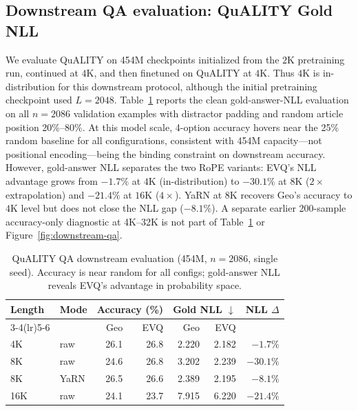 \subsection{Downstream QA evaluation: QuALITY Gold NLL}

We evaluate QuALITY \citep{pang2022quality} on 454M checkpoints initialized from the $2$K pretraining run, continued at $4$K, and then finetuned on QuALITY at $4$K. Thus $4$K is in-distribution for this downstream protocol, although the initial pretraining checkpoint used $L{=}2048$. Table~\ref{tab:quality-nll} reports the clean gold-answer-NLL evaluation on all $n{=}2086$ validation examples with distractor padding and random article position 20\%--80\%. At this model scale, 4-option accuracy hovers near the 25\% random baseline for all configurations, consistent with 454M capacity---not positional encoding---being the binding constraint on downstream accuracy. However, gold-answer NLL separates the two RoPE variants: EVQ's NLL advantage grows from \(-1.7\%\) at \(4\mathrm{K}\) (in-distribution) to \(-30.1\%\) at \(8\mathrm{K}\) (\(2\times\) extrapolation) and \(-21.4\%\) at \(16\mathrm{K}\) (\(4\times\)). YaRN at \(8\mathrm{K}\) recovers Geo's accuracy to \(4\mathrm{K}\) level but does not close the NLL gap (\(-8.1\%\)). A separate earlier 200-sample accuracy-only diagnostic at 4K--32K is not part of Table~\ref{tab:quality-nll} or Figure~\ref{fig:downstream-qa}.

\begin{table}[ht]
\caption{QuALITY QA downstream evaluation (454M, \(n{=}2086\), single seed). Accuracy is near random for all configs; gold-answer NLL reveals EVQ's advantage in probability space.}
\label{tab:quality-nll}
\centering
\small
\begin{tabular}{@{}l l r r r r r@{}}
\toprule
Length & Mode & \multicolumn{2}{c}{Accuracy (\%)} & \multicolumn{2}{c}{Gold NLL \(\downarrow\)} & NLL \(\Delta\) \\
\cmidrule(lr){3-4}\cmidrule(lr){5-6}
& & Geo & EVQ & Geo & EVQ & \\
\midrule
4K & raw & 26.1 & 26.8 & 2.220 & 2.182 & \(-1.7\%\) \\
8K & raw & 24.6 & 26.8 & 3.202 & 2.239 & \(\mathbf{-30.1\%}\) \\
8K & YaRN & 26.5 & 26.6 & 2.389 & 2.195 & \(-8.1\%\) \\
16K & raw & 24.1 & 23.7 & 7.915 & 6.220 & \(-21.4\%\) \\
\bottomrule
\end{tabular}
\end{table}

